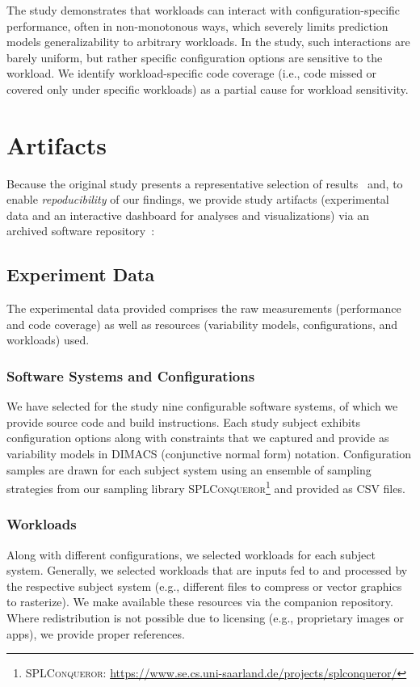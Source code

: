 \documentclass[10pt,conference]{IEEEtran}
\begin{document}
	The study demonstrates that workloads can interact with configuration-specific performance, often in non-monotonous ways, which severely limits prediction models generalizability to arbitrary workloads. In the study, such interactions are barely uniform, but rather specific configuration options are sensitive to the workload. We identify workload-specific code coverage (i.e., code missed or covered only  under specific workloads) as a partial cause for workload sensitivity.
	
	\section{Artifacts}
	Because the original study presents a representative selection of results~\cite{muhlbauer_workload_2023} and, to enable \textit{repoducibility} of our findings, we provide study artifacts (experimental data and an interactive dashboard for analyses and visualizations) via an archived software repository~\cite{muhlbauer_workload_2023_companion}:

	\subsection{Experiment Data}
	The experimental data provided comprises the raw measurements (performance and code coverage) as well as resources (variability models, configurations, and workloads) used.
	
\subsubsection{Software Systems and Configurations}
	We have selected for the study nine configurable software systems, of which we provide source code and build instructions. Each study subject exhibits configuration options along with constraints that we captured and provide as variability models in DIMACS (conjunctive normal form) notation. Configuration samples are drawn for each subject system using an ensemble of sampling strategies from our sampling library \textsc{SPLConqueror}\footnote{\textsc{SPLConqueror}: \url{https://www.se.cs.uni-saarland.de/projects/splconqueror/}} and provided as CSV files.
	
	\subsubsection{Workloads}
	Along with different configurations, we selected workloads for each subject system. Generally, we selected workloads that are inputs fed to and processed by the respective subject system (e.g., different files to compress or vector graphics to rasterize). We make available these resources via the companion repository. {\color{orange!70!black}Where redistribution is not possible due to licensing (e.g., proprietary images or apps), we provide proper references}. 
	
\end{document}
